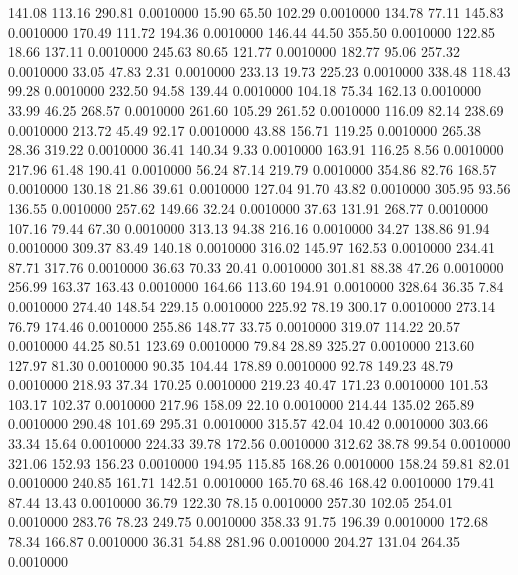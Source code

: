  141.08  113.16  290.81   0.0010000
  15.90   65.50  102.29   0.0010000
 134.78   77.11  145.83   0.0010000
 170.49  111.72  194.36   0.0010000
 146.44   44.50  355.50   0.0010000
 122.85   18.66  137.11   0.0010000
 245.63   80.65  121.77   0.0010000
 182.77   95.06  257.32   0.0010000
  33.05   47.83    2.31   0.0010000
 233.13   19.73  225.23   0.0010000
 338.48  118.43   99.28   0.0010000
 232.50   94.58  139.44   0.0010000
 104.18   75.34  162.13   0.0010000
  33.99   46.25  268.57   0.0010000
 261.60  105.29  261.52   0.0010000
 116.09   82.14  238.69   0.0010000
 213.72   45.49   92.17   0.0010000
  43.88  156.71  119.25   0.0010000
 265.38   28.36  319.22   0.0010000
  36.41  140.34    9.33   0.0010000
 163.91  116.25    8.56   0.0010000
 217.96   61.48  190.41   0.0010000
  56.24   87.14  219.79   0.0010000
 354.86   82.76  168.57   0.0010000
 130.18   21.86   39.61   0.0010000
 127.04   91.70   43.82   0.0010000
 305.95   93.56  136.55   0.0010000
 257.62  149.66   32.24   0.0010000
  37.63  131.91  268.77   0.0010000
 107.16   79.44   67.30   0.0010000
 313.13   94.38  216.16   0.0010000
  34.27  138.86   91.94   0.0010000
 309.37   83.49  140.18   0.0010000
 316.02  145.97  162.53   0.0010000
 234.41   87.71  317.76   0.0010000
  36.63   70.33   20.41   0.0010000
 301.81   88.38   47.26   0.0010000
 256.99  163.37  163.43   0.0010000
 164.66  113.60  194.91   0.0010000
 328.64   36.35    7.84   0.0010000
 274.40  148.54  229.15   0.0010000
 225.92   78.19  300.17   0.0010000
 273.14   76.79  174.46   0.0010000
 255.86  148.77   33.75   0.0010000
 319.07  114.22   20.57   0.0010000
  44.25   80.51  123.69   0.0010000
  79.84   28.89  325.27   0.0010000
 213.60  127.97   81.30   0.0010000
  90.35  104.44  178.89   0.0010000
  92.78  149.23   48.79   0.0010000
 218.93   37.34  170.25   0.0010000
 219.23   40.47  171.23   0.0010000
 101.53  103.17  102.37   0.0010000
 217.96  158.09   22.10   0.0010000
 214.44  135.02  265.89   0.0010000
 290.48  101.69  295.31   0.0010000
 315.57   42.04   10.42   0.0010000
 303.66   33.34   15.64   0.0010000
 224.33   39.78  172.56   0.0010000
 312.62   38.78   99.54   0.0010000
 321.06  152.93  156.23   0.0010000
 194.95  115.85  168.26   0.0010000
 158.24   59.81   82.01   0.0010000
 240.85  161.71  142.51   0.0010000
 165.70   68.46  168.42   0.0010000
 179.41   87.44   13.43   0.0010000
  36.79  122.30   78.15   0.0010000
 257.30  102.05  254.01   0.0010000
 283.76   78.23  249.75   0.0010000
 358.33   91.75  196.39   0.0010000
 172.68   78.34  166.87   0.0010000
  36.31   54.88  281.96   0.0010000
 204.27  131.04  264.35   0.0010000
